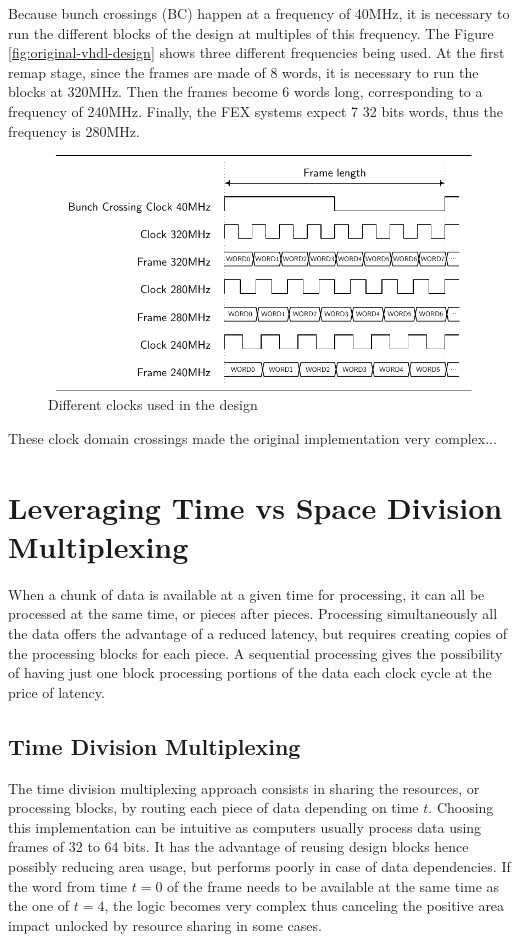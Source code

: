 Because bunch crossings (BC) happen at a frequency of 40MHz, it is necessary to run the different blocks of the design at multiples of this frequency. The Figure \ref{fig:original-vhdl-design} shows three different frequencies being used. At the first remap stage, since the frames are made of 8 words, it is necessary to run the blocks at 320MHz. Then the frames become 6 words long, corresponding to a frequency of 240MHz. Finally, the FEX systems expect 7 32 bits words, thus the frequency is 280MHz.

\begin{figure}[htb]
    \centering
    \includegraphics{timings/bc_clocks}
    \caption{Different clocks used in the design}
    \label{fig:bc-clocks}
\end{figure}

These clock domain crossings made the original implementation very complex...

\section{Leveraging Time vs Space Division Multiplexing}\label{sec:leveraging-time-division-multiplexing}

When a chunk of data is available at a given time for processing, it can all be processed at the same time, or pieces after pieces.
Processing simultaneously all the data offers the advantage of a reduced latency, but requires creating copies of the processing blocks for each piece. A sequential processing gives the possibility of having just one block processing portions of the data each clock cycle at the price of latency.

\subsection{Time Division Multiplexing}\label{sec:time-division-multiplexing}
The time division multiplexing approach consists in sharing the resources, or processing blocks, by routing each piece of data depending on time \(t\). Choosing this implementation can be intuitive as computers usually process data using frames of 32 to 64 bits. It has the advantage of reusing design blocks hence possibly reducing area usage, but performs poorly in case of data dependencies. If the word from time \(t=0\) of the frame needs to be available at the same time as the one of \(t=4\), the logic becomes very complex thus canceling the positive area impact unlocked by resource sharing in some cases.


